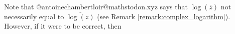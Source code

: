 \documentclass{article}
\theoremstyle{definition}
\begin{document}

\bigskip
\noindent
Note that @antoinechambertloir@mathstodon.xyz says that $\log (\overline{z})$ not necessarily equal
to $\overline{\log(z)}$ (see Remark \ref{remark:complex_logarithm}). However, if it were to be 
correct, then
\end{document}
